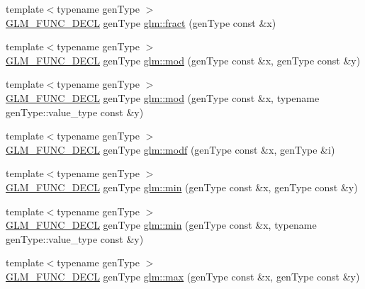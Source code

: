 \begin{DoxyCompactItemize}
\item 
{\footnotesize template$<$typename gen\+Type $>$ }\\\hyperlink{setup_8hpp_ab2d052de21a70539923e9bcbf6e83a51}{G\+L\+M\+\_\+\+F\+U\+N\+C\+\_\+\+D\+E\+CL} gen\+Type \hyperlink{group__core__func__common_gad04ac2908d032d5518d5f6c8403dbc8b}{glm\+::fract} (gen\+Type const \&x)
\item 
{\footnotesize template$<$typename gen\+Type $>$ }\\\hyperlink{setup_8hpp_ab2d052de21a70539923e9bcbf6e83a51}{G\+L\+M\+\_\+\+F\+U\+N\+C\+\_\+\+D\+E\+CL} gen\+Type \hyperlink{group__core__func__common_ga8cc8a75b05125fe1c30de43102ef42e1}{glm\+::mod} (gen\+Type const \&x, gen\+Type const \&y)
\item 
{\footnotesize template$<$typename gen\+Type $>$ }\\\hyperlink{setup_8hpp_ab2d052de21a70539923e9bcbf6e83a51}{G\+L\+M\+\_\+\+F\+U\+N\+C\+\_\+\+D\+E\+CL} gen\+Type \hyperlink{group__core__func__common_gad2127c78cb9e89ab462892b11417ded3}{glm\+::mod} (gen\+Type const \&x, typename gen\+Type\+::value\+\_\+type const \&y)
\item 
{\footnotesize template$<$typename gen\+Type $>$ }\\\hyperlink{setup_8hpp_ab2d052de21a70539923e9bcbf6e83a51}{G\+L\+M\+\_\+\+F\+U\+N\+C\+\_\+\+D\+E\+CL} gen\+Type \hyperlink{group__core__func__common_gae47da02eb07d660201c09a0df7298a05}{glm\+::modf} (gen\+Type const \&x, gen\+Type \&i)
\item 
{\footnotesize template$<$typename gen\+Type $>$ }\\\hyperlink{setup_8hpp_ab2d052de21a70539923e9bcbf6e83a51}{G\+L\+M\+\_\+\+F\+U\+N\+C\+\_\+\+D\+E\+CL} gen\+Type \hyperlink{group__core__func__common_ga3dc90dbd66c9ca1dd5625c93d9c50f02}{glm\+::min} (gen\+Type const \&x, gen\+Type const \&y)
\item 
{\footnotesize template$<$typename gen\+Type $>$ }\\\hyperlink{setup_8hpp_ab2d052de21a70539923e9bcbf6e83a51}{G\+L\+M\+\_\+\+F\+U\+N\+C\+\_\+\+D\+E\+CL} gen\+Type \hyperlink{group__core__func__common_gac0f3dec634730c146c121a6517441c9a}{glm\+::min} (gen\+Type const \&x, typename gen\+Type\+::value\+\_\+type const \&y)
\item 
{\footnotesize template$<$typename gen\+Type $>$ }\\\hyperlink{setup_8hpp_ab2d052de21a70539923e9bcbf6e83a51}{G\+L\+M\+\_\+\+F\+U\+N\+C\+\_\+\+D\+E\+CL} gen\+Type \hyperlink{group__core__func__common_gaa228561a9da55898f8f72ad2403fafac}{glm\+::max} (gen\+Type const \&x, gen\+Type const \&y)

\end{DoxyCompactItemize}
